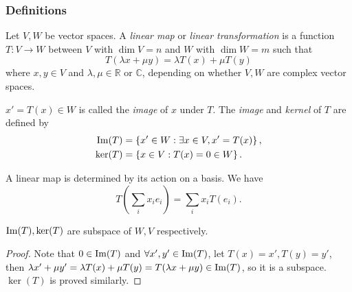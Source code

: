 \documentclass[a4paper]{article}
\begin{document}
\subsubsection{Definitions}
\begin{definition}
  Let $ V,W $ be vector spaces. A \textit{linear map} or
  \textit{linear transformation} is a function $ T:V\to W $ between
  $V$ with $\dim V=n$ and $W$ with $\dim W=m$ such that
  \[
    T(\lambda x+ \mu y)=\lambda T(x)+\mu T(y)
  \]
  where $ x,y\in V $ and $ \lambda,\mu\in \mathbb{R}$ or $ \mathbb{C}
  $, depending on whether $V,W$ are complex vector spaces.

  $ x'=T(x)\in W $ is called the \textit{image} of $x$ under $T$. The
  \textit{image} and \textit{kernel} of $T$ are defined by
  \[
    \begin{aligned}
      \operatorname{Im}(T)&=\left\{ x'\in W: \exists x\in V, x'=T(x)\right\},\\
      \ker(T)&=\left\{ x\in V:T(x)=0\in W\right\}.
    \end{aligned}
  \]
\end{definition}
\begin{remark}
  A linear map is determined by its action on a basis. We have
  \[
    T\left( \sum_{i}x_i e_i \right)=\sum_{i}x_i T(e_i)
  .\]
\end{remark}
\begin{lemma}\label{lma:ker,im subspace}
  $ \operatorname{Im}(T),\ker(T) $ are subspace of $ W,V $ respectively.
\end{lemma}
\begin{proof}
  Note that $ 0\in \operatorname{Im}(T) $ and $ \forall x',y'\in\operatorname{Im}(T)  $, let $
  T(x)=x',T(y)=y' $, then $  \lambda x'+\mu y'=\lambda T(x)+\mu
  T(y)=T(\lambda x+\mu y)\in \operatorname{Im}(T) $, so it is a subspace. $\ker(T)$
  is proved similarly.
\end{proof}
\end{document}
